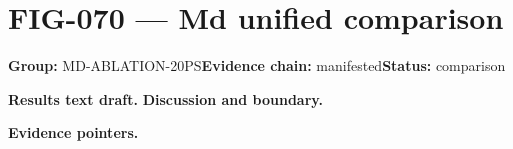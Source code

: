 \clearpage
\section{FIG-070 --- Md unified comparison}
\label{figpage:fig-070}
\textbf{Group:} MD-ABLATION-20PS\quad \textbf{Evidence chain:} manifested\quad \textbf{Status:} comparison

\textbf{Results text draft.} 
\textbf{Discussion and boundary.} 


\textbf{Evidence pointers.}



\vfill
